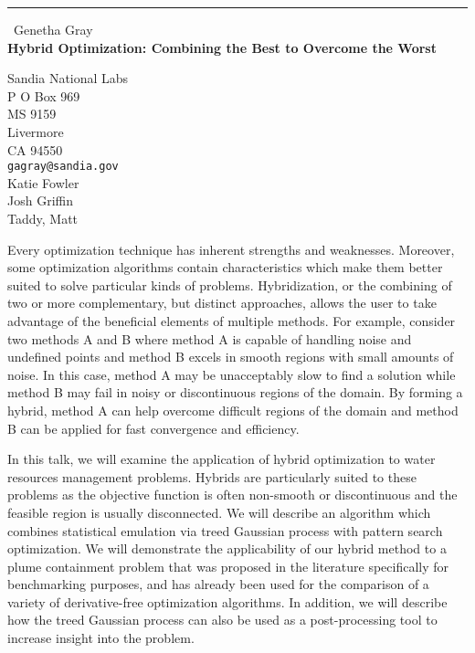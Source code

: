 \documentclass{report}
\begin{document}
\begin{center}
\rule{6in}{1pt} \
{\large Genetha Gray \\
{\bf Hybrid Optimization: Combining the Best to Overcome the Worst}}

Sandia National Labs \\ P O Box 969 \\ MS 9159 \\ Livermore \\ CA 94550
\\
{\tt gagray@sandia.gov}\\
Katie Fowler\\
Josh Griffin\\
	Taddy, Matt\end{center}

Every optimization technique has inherent strengths and weaknesses.
Moreover, some optimization algorithms contain characteristics which make
them better suited to solve particular kinds of problems. Hybridization,
or the combining of two or more complementary, but distinct approaches,
allows the user to take advantage of the beneficial elements of multiple
methods. For example, consider two methods A and B where method A is
capable of handling noise and undefined points and method B excels in
smooth regions with small amounts of noise. In this case, method A may be
unacceptably slow to find a solution while method B may fail in noisy or
discontinuous regions of the domain. By forming a hybrid,
method A can help overcome difficult regions of the domain and method B
can be applied for fast convergence and efficiency.

In this talk, we will examine the application of hybrid optimization to
water resources management problems. Hybrids are particularly suited to
these problems as the objective function is often non-smooth or
discontinuous and the feasible region is usually disconnected. We will
describe an algorithm which combines statistical emulation via treed
Gaussian process with pattern search optimization. We will demonstrate
the applicability of our hybrid method to a plume containment problem
that was proposed in the literature specifically for benchmarking
purposes, and has
already been used for the comparison of a variety of derivative-free
optimization algorithms. In addition, we will describe how the treed
Gaussian process can also be used as a post-processing tool to increase
insight into the problem.
\end{document}
